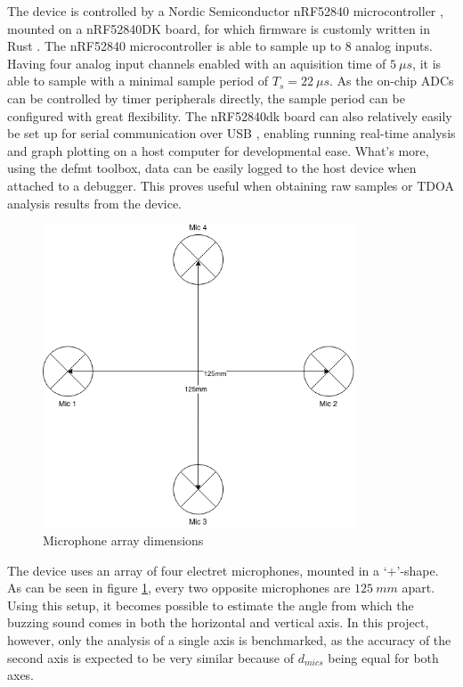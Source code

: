 \documentclass[a4paper]{article}
\begin{document}
The device is controlled by a Nordic Semiconductor nRF52840 microcontroller \cite{nrf52840}, mounted on a nRF52840DK board, for which firmware is customly written in Rust \cite{rust}.  The nRF52840 microcontroller is able to sample up to 8 analog inputs. Having four analog input channels enabled with an aquisition time of $5\ \mu s$, it is able to sample with a minimal sample period of $ T_s = 22\ \mu s$. As the on-chip ADCs can be controlled by timer peripherals directly, the sample period can be configured with great flexibility. The nRF52840dk board can also relatively easily be set up for serial communication over USB \cite{usb}, enabling running real-time analysis and graph plotting on a host computer for developmental ease. What's more, using the defmt \cite{defmt} toolbox, data can be easily logged to the host device when attached to a debugger. This proves useful when obtaining raw samples or TDOA analysis results from the device.

\begin{figure}[H]
    \begin{center}
        \includegraphics[width=25em]{assets/mic_array_dimensions.png}
        \caption{Microphone array dimensions}
        \label{fig:mic_array_dimensions}
    \end{center}
\end{figure}

The device uses an array of four electret microphones, mounted in a `+'-shape. As can be seen in figure \ref{fig:mic_array_dimensions}, every two opposite microphones are $125\ mm$ apart. Using this setup, it becomes possible to estimate the angle from which the buzzing sound comes in both the horizontal and vertical axis. In this project, however, only the analysis of a single axis is benchmarked, as the accuracy of the second axis is expected to be very similar because of $d_{mics}$ being equal for both axes.
\end{document}

